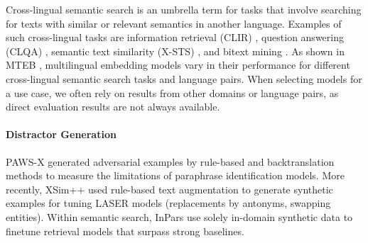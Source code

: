 Cross-lingual semantic search is an umbrella term for tasks that involve searching for texts with similar or relevant semantics in another language. Examples of such cross-lingual tasks are information retrieval (CLIR) \citep{lawrie2023overviewtrec2022neuclir,lawrie2024overviewtrec2023neuclir}, question answering (CLQA) \citep{lewis-etal-2020-mlqa}, semantic text similarity (X-STS) \citep{cer2017semeval}, and bitext mining \citep{tatoeba, zweigenbaum2018overview}. As shown in MTEB \citep{muennighoff-etal-2023-mteb}, multilingual embedding models vary in their performance for different cross-lingual semantic search tasks and language pairs. When selecting models for a use case, we often rely on results from other domains or language pairs, as direct evaluation results are not always available.

\paragraph{\textbf{Distractor Generation}}

PAWS-X \citep{yang2019paws,zhang-etal-2019-paws} generated adversarial examples by rule-based and backtranslation methods to measure the limitations of paraphrase identification models.  More recently, XSim++ \citep{chen-etal-2023-xsim} used rule-based text augmentation to generate synthetic examples for tuning LASER models (replacements by antonyms, swapping entities). Within semantic search, InPars \citep{bonifacio2022mmarcomultilingualversionms} use solely in-domain synthetic data to finetune retrieval models that surpass strong baselines.


